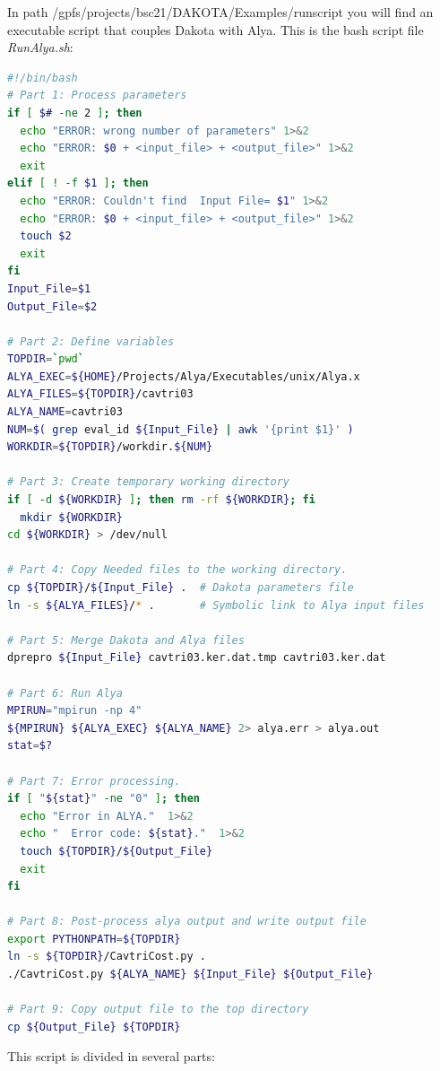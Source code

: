 \documentclass[12pt,a4paper,article]{memoir}
\begin{document}
In path /gpfs/projects/bsc21/DAKOTA/Examples/runscript you will find an executable script that couples Dakota with Alya. This is the bash script file \textit{RunAlya.sh}:

\begin{lstlisting}[style=MyCodeStyle,language=bash]
#!/bin/bash
# Part 1: Process parameters
if [ $# -ne 2 ]; then
  echo "ERROR: wrong number of parameters" 1>&2
  echo "ERROR: $0 + <input_file> + <output_file>" 1>&2
  exit
elif [ ! -f $1 ]; then
  echo "ERROR: Couldn't find  Input File= $1" 1>&2
  echo "ERROR: $0 + <input_file> + <output_file>" 1>&2
  touch $2
  exit 
fi
Input_File=$1
Output_File=$2

# Part 2: Define variables
TOPDIR=`pwd`
ALYA_EXEC=${HOME}/Projects/Alya/Executables/unix/Alya.x
ALYA_FILES=${TOPDIR}/cavtri03
ALYA_NAME=cavtri03
NUM=$( grep eval_id ${Input_File} | awk '{print $1}' )
WORKDIR=${TOPDIR}/workdir.${NUM}

# Part 3: Create temporary working directory
if [ -d ${WORKDIR} ]; then rm -rf ${WORKDIR}; fi
  mkdir ${WORKDIR}
cd ${WORKDIR} > /dev/null

# Part 4: Copy Needed files to the working directory.
cp ${TOPDIR}/${Input_File} .  # Dakota parameters file
ln -s ${ALYA_FILES}/* .       # Symbolic link to Alya input files

# Part 5: Merge Dakota and Alya files
dprepro ${Input_File} cavtri03.ker.dat.tmp cavtri03.ker.dat

# Part 6: Run Alya
MPIRUN="mpirun -np 4"
${MPIRUN} ${ALYA_EXEC} ${ALYA_NAME} 2> alya.err > alya.out
stat=$?

# Part 7: Error processing.
if [ "${stat}" -ne "0" ]; then
  echo "Error in ALYA."  1>&2
  echo "  Error code: ${stat}."  1>&2
  touch ${TOPDIR}/${Output_File}
  exit
fi

# Part 8: Post-process alya output and write output file
export PYTHONPATH=${TOPDIR}
ln -s ${TOPDIR}/CavtriCost.py .
./CavtriCost.py ${ALYA_NAME} ${Input_File} ${Output_File}

# Part 9: Copy output file to the top directory
cp ${Output_File} ${TOPDIR}
\end{lstlisting}

This script is divided in several parts:
\end{document}
